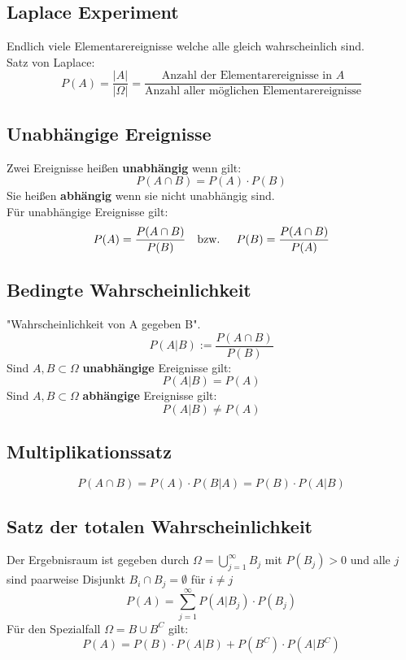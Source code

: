 \documentclass[12pt]{article}
\begin{document}
\subsection{Laplace Experiment}
Endlich viele Elementarereignisse welche alle gleich wahrscheinlich sind.\\
Satz von Laplace:
\begin{equation}
	P(A) = \frac{|A|}{|\Omega|}=\frac{\text{Anzahl der Elementarereignisse in $A$}}{\text{Anzahl aller möglichen Elementarereignisse}}
\end{equation}
\subsection{Unabhängige Ereignisse}
Zwei Ereignisse heißen \textbf{unabhängig} wenn gilt: 
\begin{equation}
	P(A\cap B) = P(A) \cdot P(B)
\end{equation}
Sie heißen \textbf{abhängig} wenn sie nicht unabhängig sind.\\
Für unabhängige Ereignisse gilt:
\begin{equation}
	P(A) = \frac{P(A\cap B)}{P(B)} \text{\quad bzw. \quad} P(B)=\frac{P(A\cap B)}{P(A)}
\end{equation} 
\subsection{Bedingte Wahrscheinlichkeit}
"Wahrscheinlichkeit von A gegeben B".
\begin{equation}
	P(A|B) := \frac{P(A\cap B)}{P(B)}
\end{equation}
Sind $A, B \subset \Omega$ \textbf{unabhängige} Ereignisse gilt:
\begin{equation}
	P(A|B) = P(A)
\end{equation}
Sind $A, B \subset \Omega$ \textbf{abhängige} Ereignisse gilt:
\begin{equation}
	P(A|B) \neq P(A)
\end{equation}
\subsection{Multiplikationssatz}
\begin{equation}
	P(A\cap B) = P(A) \cdot P(B|A) = P(B) \cdot P(A|B)
\end{equation}
\subsection{Satz der totalen Wahrscheinlichkeit}
Der Ergebnisraum ist gegeben durch $\Omega = \bigcup\limits_{j=1}^\infty B_j$ mit $P(B_j)>0$ und alle $j$ sind paarweise Disjunkt $B_i \cap B_j = \emptyset$ für $i\neq j$
\begin{equation}
	P(A) = \sum_{j=1}^\infty P(A|B_j) \cdot P(B_j)
\end{equation}
Für den Spezialfall $\Omega = B\cup B^C$ gilt:
\begin{equation}
	P(A) = P(B) \cdot P(A|B) + P(B^C) \cdot P(A|B^C)
\end{equation}
\end{document}
